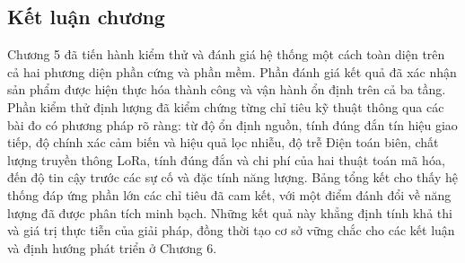 \subsection{Kết luận chương}
Chương 5 đã tiến hành kiểm thử và đánh giá hệ thống một cách toàn diện trên cả hai phương diện phần cứng và phần mềm. Phần đánh giá kết quả đã xác nhận sản phẩm được hiện thực hóa thành công và vận hành ổn định trên cả ba tầng. Phần kiểm thử định lượng đã kiểm chứng từng chỉ tiêu kỹ thuật thông qua các bài đo có phương pháp rõ ràng: từ độ ổn định nguồn, tính đúng đắn tín hiệu giao tiếp, độ chính xác cảm biến và hiệu quả lọc nhiễu, độ trễ Điện toán biên, chất lượng truyền thông LoRa, tính đúng đắn và chi phí của hai thuật toán mã hóa, đến độ tin cậy trước các sự cố và đặc tính năng lượng. Bảng tổng kết cho thấy hệ thống đáp ứng phần lớn các chỉ tiêu đã cam kết, với một điểm đánh đổi về năng lượng đã được phân tích minh bạch. Những kết quả này khẳng định tính khả thi và giá trị thực tiễn của giải pháp, đồng thời tạo cơ sở vững chắc cho các kết luận và định hướng phát triển ở Chương 6.
